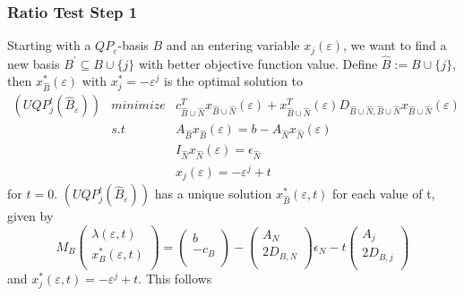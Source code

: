 \documentclass[a4paper]{article}
\begin{document}
\subsubsection{Ratio Test Step 1}
Starting with a $QP_{\varepsilon}$-basis $B$ and an entering variable
$x_{j}(\varepsilon)$,
we want to find a new basis $B^{\prime} \subseteq B \cup \{j\}$ with
better objective function value.
Define $\hat{B}:=B \cup \{j\}$, then $x_{\hat{B}}^{*}(\varepsilon)$ with
$x_{j}^{*}=-\varepsilon^{j}$ is the optimal solution to
\begin{eqnarray*}
(UQP_{j}^{t}(\hat{B}_{\varepsilon})) & minimize &
  c_{\hat{B} \cup \hat{N}}^{T}x_{\hat{B} \cup \hat{N}}(\varepsilon)
  + x_{\hat{B} \cup \hat{N}}^{T}(\varepsilon)
  D_{\hat{B} \cup \hat{N},\hat{B} \cup \hat{N}}
  x_{\hat{B} \cup \hat{N}}(\varepsilon)  \\
  & s.t & A_{\hat{B}}x_{\hat{B}}(\varepsilon) =
  b - A_{\hat{N}}x_{\hat{N}}(\varepsilon) \\
  & & I_{\hat{N}}x_{\hat{N}}(\varepsilon) = \epsilon_{\hat{N}} \\
  & & x_{j}(\varepsilon) = - \varepsilon^{j} + t
\end{eqnarray*}
for $t=0$. $(UQP_{j}^{t}(\hat{B}_{\varepsilon}))$ has a unique solution
$x_{\hat{B}}^{*}(\varepsilon, t)$ for each value of t, given by
\begin{equation}
\label{eq:UQP_j_t_opt_explicit}
M_{B}\left(\begin{array}{c}
              \lambda\left(\varepsilon, t\right) \\
	      \hline
	      x_{B}^{*}\left(\varepsilon, t\right) \\
	    \end{array}
      \right)
=
\left(\begin{array}{c}
         b \\
	 \hline
	 -c_{B} \\
      \end{array}
\right)
-
\left(\begin{array}{c}
         A_{N} \\
	 \hline
	 2D_{B,N} \\
       \end{array}
\right) \epsilon_{N}
-t
\left(\begin{array}{c}
         A_{j} \\
	 \hline
	 2D_{B,j} \\
      \end{array}
\right)
\end{equation}
and $x_{j}^{*}\left(\varepsilon,t\right)= -\varepsilon^{j} + t$. This follows
\end{document}
